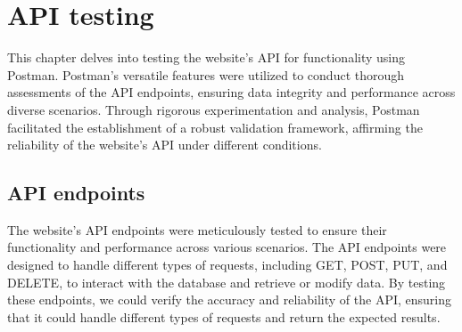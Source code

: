 




\section{API testing}
This chapter delves into testing the website's API for functionality using 
Postman. Postman's versatile features were utilized to conduct thorough 
assessments of the API endpoints, ensuring data integrity and performance 
across diverse scenarios. Through rigorous experimentation and analysis, 
Postman facilitated the establishment of a robust validation framework, 
affirming the reliability of the website's API under different conditions.

\subsection{API endpoints}
The website's API endpoints were meticulously tested to ensure their
functionality and performance across various scenarios. The API endpoints
were designed to handle different types of requests, including GET, POST,
PUT, and DELETE, to interact with the database and retrieve or modify
data. By testing these endpoints, we could verify the accuracy and
reliability of the API, ensuring that it could handle different types of
requests and return the expected results.

